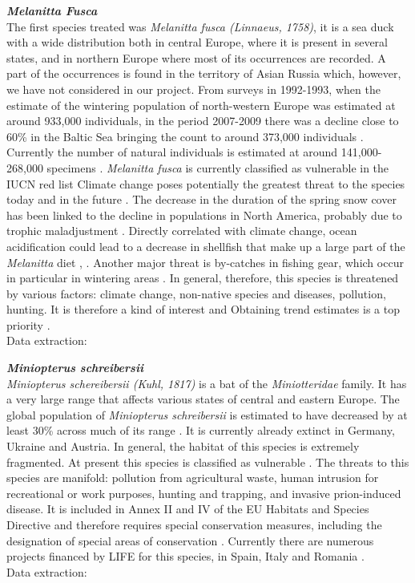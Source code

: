 \documentclass[12pt,a4paper]{article}
\begin{document}
\bigskip
{\noindent \textbf{\textit{Melanitta Fusca}}} 
\\
The first species treated was \textit{Melanitta fusca (Linnaeus, 1758)}, it is a sea duck with a wide distribution both in central Europe, where it is present in several states, and in northern Europe where most of its occurrences are recorded.
A part of the occurrences is found in the territory of Asian Russia which, however, we have not considered in our project.
From surveys in 1992-1993, when the estimate of the wintering population of north-western Europe was estimated at around 933,000 individuals, in the period 2007-2009 there was a decline close to 60\% in the Baltic Sea bringing the count to around 373,000 individuals \citep{skov}.
Currently the number of natural individuals is estimated at around 141,000-268,000 specimens \citep{IUCN}.
\textit{Melanitta fusca} is currently classified as vulnerable in the IUCN red list \citep{IUCN}
Climate change poses potentially the greatest threat to the species today and in the future . The decrease in the duration of the spring snow cover has been linked to the decline in populations in North America, probably due to trophic maladjustment \citep{drever}.
Directly correlated with climate change, ocean acidification could lead to a decrease in shellfish that make up a large part of the \textit{Melanitta} diet \citep{stein}, \citep{carb}.
Another major threat is by-catches in fishing gear, which occur in particular in wintering areas \citep*{dagys}.
In general, therefore, this species is threatened by various factors: climate change, non-native species and diseases, pollution, hunting.\citep{IUCN}
It is therefore a kind of interest and Obtaining trend estimates is a top priority \citep{IUCN}.\\
Data extraction: \citep{mela}

\bigskip
{\noindent \textbf{\textit{Miniopterus schreibersii}}} 
\\
\textit{Miniopterus schereibersii (Kuhl, 1817)} is a bat of the \textit{Miniotteridae} family.
It has a very large range that affects various states of central and eastern Europe.
The global population of \textit{Miniopterus schreibersii} is estimated to have decreased by at least 30\% across much of its range \citep{IUCN}. It is currently already extinct in Germany, Ukraine and Austria. In general, the habitat of this species is extremely fragmented. At present this species is classified as vulnerable \citep{IUCN}.
The threats to this species are manifold: pollution from agricultural waste, human intrusion for recreational or work purposes, hunting and trapping, and invasive prion-induced disease.
It is included in Annex II and IV of the EU Habitats and Species Directive and therefore requires special conservation measures, including the designation of special areas of conservation \citep{dir}.
Currently there are numerous projects financed by LIFE for this species, in Spain, Italy and Romania \citep{IUCN}.\\
Data extraction: \citep{minio}
\end{document}
